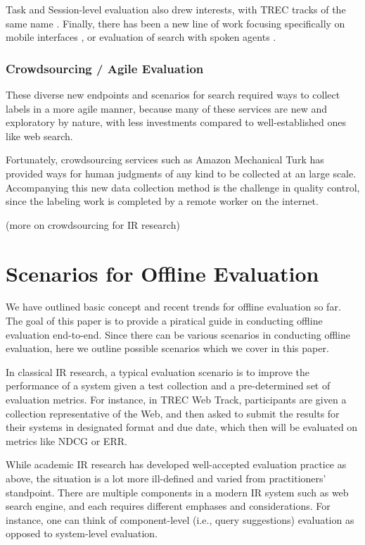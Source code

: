 \documentclass[openany]{now} %
\begin{document}
Task and Session-level evaluation \cite{KanoulasCCS11, CarteretteKHC14} also drew interests, with TREC tracks of the same name \cite{}. Finally, there has been a new line of work focusing specifically on mobile interfaces \cite{VermaYC16}, or evaluation of search with spoken agents \cite{Kiseleva:2016}.

\subsubsection{Crowdsourcing / Agile Evaluation}

These diverse new endpoints and scenarios for search required ways to collect labels in a more agile manner, because many of these services are new and exploratory by nature, with less investments compared to well-established ones like web search.

Fortunately, crowdsourcing services such as Amazon Mechanical Turk has provided ways for human judgments of any kind to be collected at an large scale. Accompanying this new data collection method is the challenge in quality control, since the labeling work is completed by a remote worker on the internet.

(more on crowdsourcing for IR research)

\section{Scenarios for Offline Evaluation}

We have outlined basic concept and recent trends for offline evaluation so far. The goal of this paper is to provide a piratical guide in conducting offline evaluation end-to-end. Since there can be various scenarios in conducting offline evaluation, here we outline possible scenarios which we cover in this paper.

In classical IR research, a typical evaluation scenario is to improve the performance of a system given a test collection and a pre-determined set of evaluation metrics. For instance, in TREC Web Track, participants are given a collection representative of the Web, and then asked to submit the results for their systems in designated format and due date, which then will be evaluated on metrics like NDCG or ERR.

While academic IR research has developed well-accepted evaluation practice as above, the situation is a lot more ill-defined and varied from practitioners' standpoint. There are multiple components in a modern IR system such as web search engine, and each requires different emphases and considerations. For instance, one can think of component-level (i.e., query suggestions) evaluation as opposed to system-level evaluation. 
\end{document}
